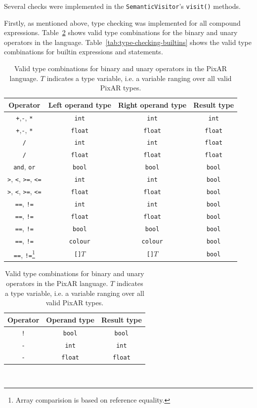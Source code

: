 \documentclass[11pt,a4paper]{scrartcl}
\begin{document}
Several checks were implemented in the \verb|SemanticVisitor|'s \verb|visit()| methods.

Firstly, as mentioned above, type checking was implemented for all compound expressions. Table~\ref{tab:type-checking-operators} shows valid type combinations for the binary and unary operators in the language. Table~\ref{tab:type-checking-builtins} shows the valid type combinations for builtin expressions and statements.

\begin{table}[ht]
  \centering
  \begin{tabular}{|c|c|c|c|}
    \hline
    Operator & Left operand type & Right operand type & Result type \\ \hline\hline
    \verb|+|,\verb|-|, \verb|*| & \Verb|int| & \Verb|int| & \Verb|int|\\ \hline
    \verb|+|,\verb|-|, \verb|*| & \Verb|float| & \Verb|float| & \Verb|float|\\ \hline
    \verb|/| & \Verb|int| & \Verb|int| & \Verb|float| \\ \hline
    \verb|/| & \Verb|float| & \Verb|float| & \Verb|float| \\ \hline
    \Verb|and|, \Verb|or| & \Verb|bool| & \Verb|bool| & \Verb|bool| \\ \hline
    \verb|>|, \verb|<|, \Verb|>=|, \Verb|<=| & \Verb|int| & \Verb|int| & \Verb|bool| \\ \hline
    \verb|>|, \verb|<|, \Verb|>=|, \Verb|<=| & \Verb|float| & \Verb|float| & \Verb|bool| \\ \hline
    \Verb|==|, \Verb|!=| & \Verb|int| & \Verb|int| & \Verb|bool| \\ \hline
    \Verb|==|, \Verb|!=| & \Verb|float| & \Verb|float| & \Verb|bool| \\ \hline
    \Verb|==|, \Verb|!=| & \Verb|bool| & \Verb|bool| & \Verb|bool| \\ \hline
    \Verb|==|, \Verb|!=| & \Verb|colour| & \Verb|colour| & \Verb|bool| \\ \hline
    \Verb|==|, \Verb|!=|\footnote{Array comparision is based on reference equality.} & \Verb|[]|$T$ & \Verb|[]|$T$ & \Verb|bool| \\ \hline
  \end{tabular}

  \begin{tabular}{|c|c|c|}
    \hline
    Operator & Operand type & Result type \\ \hline\hline
    \Verb|!| & \Verb|bool| & \Verb|bool| \\ \hline
    \verb|-| & \Verb|int| & \Verb|int| \\ \hline
    \verb|-| & \Verb|float| & \Verb|float| \\ \hline
  \end{tabular}

  \caption{Valid type combinations for binary and unary operators in the PixAR language. $T$ indicates a type variable, i.e. a variable ranging over all valid PixAR types.}~\label{tab:type-checking-operators}
\end{table}
\end{document}
